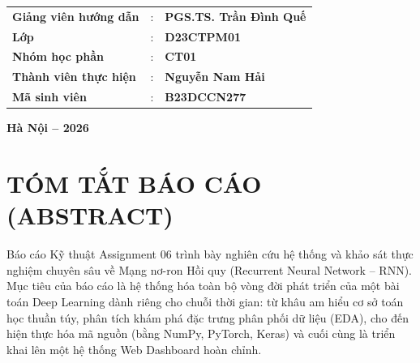 \documentclass[12pt,a4paper]{article}
\begin{document}
\begin{titlepage}
    \begin{flushleft}
        \hspace{1.6cm}
        \begin{tabular}{p{5.0cm} p{0.5cm} l}
            \textbf{Giảng viên hướng dẫn} & : & \textbf{PGS.TS. Trần Đình Quế} \\[0.3cm]
            \textbf{Lớp}                  & : & \textbf{D23CTPM01} \\[0.3cm]
            \textbf{Nhóm học phần}        & : & \textbf{CT01} \\[0.3cm]
            \textbf{Thành viên thực hiện} & : & \textbf{Nguyễn Nam Hải} \\[0.3cm]
            \textbf{Mã sinh viên}         & : & \textbf{B23DCCN277} \\[0.3cm]
        \end{tabular}
    \end{flushleft}

    \vfill
    {\large \textbf{Hà Nội -- 2026}}
    \vspace*{0.3cm}
\end{titlepage}

\newpage
\renewcommand{\contentsname}{MỤC LỤC BÁO CÁO KỸ THUẬT ASSIGNMENT 06}
\tableofcontents
\newpage

{}
\listoffigures

\vspace{0.8cm}

{}
\listoftables

\newpage

{}
\section*{TÓM TẮT BÁO CÁO (ABSTRACT)}

Báo cáo Kỹ thuật Assignment 06 trình bày nghiên cứu hệ thống và khảo sát thực nghiệm chuyên sâu về Mạng nơ-ron Hồi quy (Recurrent Neural Network -- RNN). Mục tiêu của báo cáo là hệ thống hóa toàn bộ vòng đời phát triển của một bài toán Deep Learning dành riêng cho chuỗi thời gian: từ khâu am hiểu cơ sở toán học thuần túy, phân tích khám phá đặc trưng phân phối dữ liệu (EDA), cho đến hiện thực hóa mã nguồn (bằng NumPy, PyTorch, Keras) và cuối cùng là triển khai lên một hệ thống Web Dashboard hoàn chỉnh.
\end{document}
